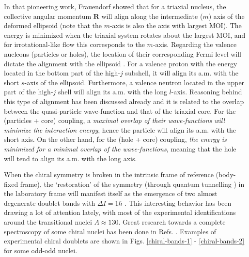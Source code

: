 In that pioneering work, Frauendorf showed that for a triaxial nucleus, the collective angular momentum $\mathbf{R}$ will align along the intermediate ($m$) axis of the deformed ellipsoid (note that the $m$-axis is also the axis with largest MOI). The energy is minimized when the triaxial system rotates about the largest MOI, and for irrotational-like flow this corresponds to the $m$-axis. Regarding the valence nucleons (particles or holes), the location of their corresponding Fermi level will dictate the alignment with the ellipsoid \cite{frauendorf1997tilted,starosta2001chiral}. For a valence proton with the energy located in the bottom part of the high-$j$ subshell, it will align its a.m. with the short $s$-axis of the ellipsoid. Furthermore, a valence neutron located in the upper part of the high-$j$ shell will align its a.m. with the long $l$-axis. Reasoning behind this type of alignment has been discussed already and it is related to the overlap between the quasi-particle wave-function and that of the triaxial core. For the (particles + core) coupling, a \emph{maximal overlap of their wave-functions will minimize the interaction energy}, hence the particle will align its a.m. with the short axis. On the other hand, for the (hole + core) coupling, \emph{the energy is minimized for a minimal overlap of the wave-functions}, meaning that the hole will tend to align its a.m. with the long axis.

When the chiral symmetry is broken in the intrinsic frame of reference (body-fixed frame), the `restoration' of the symmetry (through quantum tunnelling \cite{zhang2007chiral}) in the laboratory frame will manifest itself as the emergence of two almost degenerate doublet bands with $\Delta I=1\hbar$ \cite{frauendorf1997tilted}. This interesting behavior has been drawing a lot of attention lately, with most of the experimental identifications around the transitional nuclei $A\approx 130$. Great research towards a complete spectroscopy of some chiral nuclei has been done in Refs. \cite{starosta2001chiral,meng2008chiral,budaca2018tilted,budaca2018semiclassical,budaca2021chiral}. Examples of experimental chiral doublets are shown in Figs. \ref{chiral-bands-1} - \ref{chiral-bands-2} for some odd-odd nuclei.

